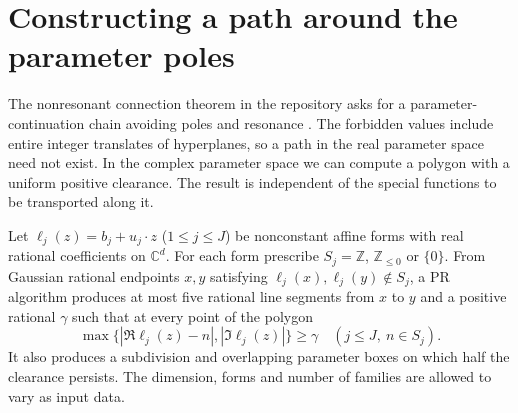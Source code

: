 \section{Constructing a path around the parameter poles}\label{sec:detours}

The nonresonant connection theorem in the repository asks for a parameter-continuation chain avoiding poles and resonance \cite{hyper}. The forbidden values include entire integer translates of hyperplanes, so a path in the real parameter space need not exist. In the complex parameter space we can compute a polygon with a uniform positive clearance. The result is independent of the special functions to be transported along it.

\begin{theorem}\label{thm:detour}
Let $\ell_j(z)=b_j+u_j\cdot z$ ($1\le j\le J$) be nonconstant affine forms with real rational coefficients on $\mathbb C^d$. For each form prescribe $S_j=\mathbb Z$, $\mathbb Z_{\le0}$ or $\{0\}$. From Gaussian rational endpoints $x,y$ satisfying $\ell_j(x),\ell_j(y)\notin S_j$, a PR algorithm produces at most five rational line segments from $x$ to $y$ and a positive rational $\gamma$ such that at every point of the polygon
\[
 \max\{|\Re\ell_j(z)-n|,|\Im\ell_j(z)|\}\ge\gamma
 \quad(j\le J,\ n\in S_j).
\]
It also produces a subdivision and overlapping parameter boxes on which half the clearance persists. The dimension, forms and number of families are allowed to vary as input data.
\end{theorem}

